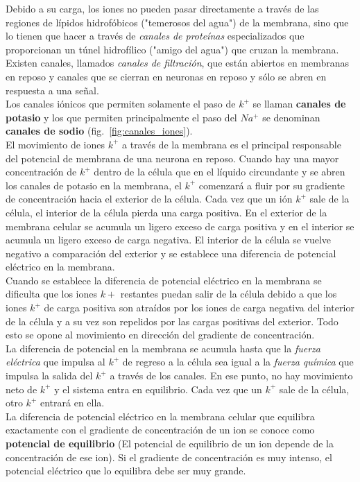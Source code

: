 Debido a su carga, los iones no pueden pasar directamente a través de las regiones de lípidos hidrofóbicos ("temerosos del agua") de la membrana, sino que lo tienen que hacer a través de \textit{canales de proteínas} especializados que proporcionan un túnel hidrofílico ("amigo del agua") que cruzan la membrana. Existen canales, llamados \textit{canales de filtración}, que están abiertos en membranas en reposo y canales que se cierran en neuronas en reposo y sólo se abren en respuesta a una señal.\\
Los canales iónicos que permiten solamente el paso de $k^+$ se llaman \textbf{canales de potasio} y los que permiten principalmente el paso del $Na^+$ se denominan \textbf{canales de sodio} (fig.~\ref{fig:canales_iones}).\\
El movimiento de iones $k^+$ a través de la membrana es el principal responsable del potencial de membrana de una neurona en reposo. Cuando hay una mayor concentración de $k^+$ dentro de la célula que en el líquido circundante y se abren los canales de potasio en la membrana, el $k^+$ comenzará a fluir por su gradiente de concentración hacia el exterior de la célula. Cada vez que un ión $k^+$ sale de la célula, el interior de la célula pierda una carga positiva. En el exterior de la membrana celular se acumula un ligero exceso de carga positiva y en el interior se acumula un ligero exceso de carga negativa. El interior de la célula se vuelve negativo a comparación del exterior y se establece una diferencia de potencial eléctrico en la membrana.\\
Cuando se establece la diferencia de potencial eléctrico en la membrana se dificulta que los iones $k+$ restantes puedan salir de la célula debido a que los iones $k^+$ de carga positiva son atraídos por los iones de carga negativa del interior de la célula y a su vez son repelidos por las cargas positivas del exterior. Todo esto se opone al movimiento en dirección del gradiente de concentración.\\
La diferencia de potencial en la membrana se acumula hasta que la \textit{fuerza eléctrica} que impulsa al $k^+$ de regreso a la célula sea igual a la \textit{fuerza química} que impulsa la salida del $k^+$ a través de los canales. En ese punto, no hay movimiento neto de $k^+$ y el sistema entra en equilibrio. Cada vez que un $k^+$ sale de la célula, otro $k^+$ entrará en ella.\\
La diferencia de potencial eléctrico en la membrana celular que equilibra exactamente con el gradiente de concentración de un ion se conoce como \textbf{potencial de equilibrio} (El potencial de equilibrio de un ion depende de la concentración de ese ion). Si el gradiente de concentración es muy intenso, el potencial eléctrico que lo equilibra debe ser muy grande.
